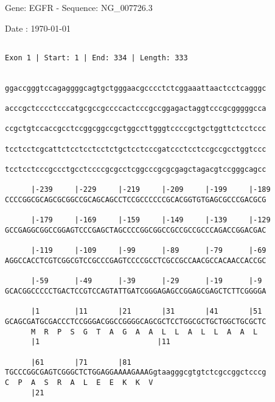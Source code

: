 \documentclass{article}
\begin{document}
\begin{center}
\begin{large}
 Gene: EGFR - Sequence: NG\_007726.3
 
 Date : \today
\end{large}
\end{center}
 \begin{Verbatim}
 
Exon 1 | Start: 1 | End: 334 | Length: 333


ggaccgggtccagaggggcagtgctgggaacgcccctctcggaaattaactcctcagggc
                                                            
acccgctcccctcccatgcgccgccccactcccgccggagactaggtcccgcgggggcca
                                                            
ccgctgtccaccgcctccggcggccgctggccttgggtccccgctgctggttctcctccc
                                                            
tcctcctcgcattctcctcctcctctgctcctcccgatccctcctccgccgcctggtccc
                                                            
tcctcctcccgccctgcctccccgcgcctcggcccgcgcgagctagacgtccgggcagcc
                                                            
      |-239     |-229     |-219     |-209     |-199     |-189
CCCCGGCGCAGCGCGGCCGCAGCAGCCTCCGCCCCCCGCACGGTGTGAGCGCCCGACGCG
                                                            
      |-179     |-169     |-159     |-149     |-139     |-129
GCCGAGGCGGCCGGAGTCCCGAGCTAGCCCCGGCGGCCGCCGCCGCCCAGACCGGACGAC
                                                            
      |-119     |-109     |-99      |-89      |-79      |-69
AGGCCACCTCGTCGGCGTCCGCCCGAGTCCCCGCCTCGCCGCCAACGCCACAACCACCGC
                                                            
      |-59      |-49      |-39      |-29      |-19      |-9 
GCACGGCCCCCTGACTCCGTCCAGTATTGATCGGGAGAGCCGGAGCGAGCTCTTCGGGGA
                                                            
      |1        |11       |21       |31       |41       |51 
GCAGCGATGCGACCCTCCGGGACGGCCGGGGCAGCGCTCCTGGCGCTGCTGGCTGCGCTC
      M  R  P  S  G  T  A  G  A  A  L  L  A  L  L  A  A  L  
      |1                           |11                     
  
      |61       |71       |81                               
TGCCCGGCGAGTCGGGCTCTGGAGGAAAAGAAAGgtaagggcgtgtctcgccggctcccg
C  P  A  S  R  A  L  E  E  K  K  V                          
      |21                                                   
  

\end{Verbatim}
\end{document}
